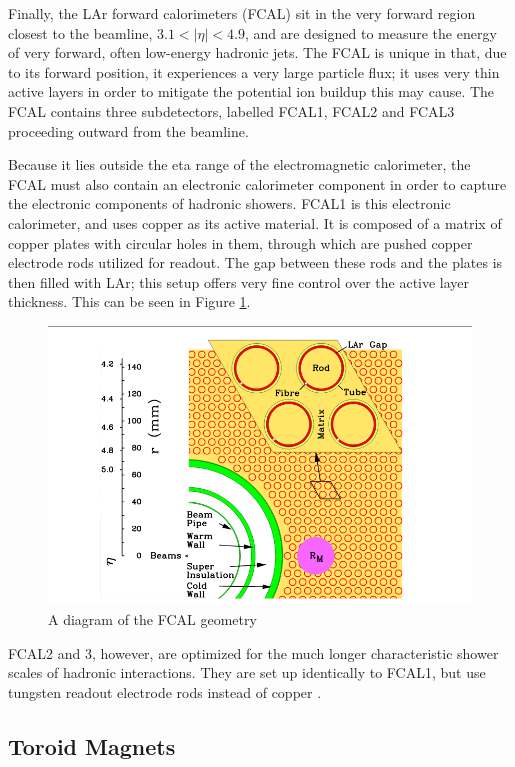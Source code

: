 Finally, the LAr forward calorimeters (FCAL) sit in the very forward region closest to the beamline, $3.1<|\eta |< 4.9$, and are designed to measure the energy of very forward, often low-energy hadronic jets.  The FCAL is unique in that, due to its forward position, it experiences a very large particle flux; it uses very thin active layers in order to mitigate the potential ion buildup this may cause.  The FCAL contains three subdetectors, labelled FCAL1, FCAL2 and FCAL3 proceeding outward from the beamline.

Because it lies outside the eta range of the electromagnetic calorimeter, the FCAL must also contain an electronic calorimeter component in order to capture the electronic components of hadronic showers. FCAL1 is this electronic calorimeter, and uses copper as its active material. It is composed of a matrix of copper plates with circular holes in them, through which are pushed copper electrode rods utilized for readout. The gap between these rods and the plates is then filled with LAr; this setup offers very fine control over the active layer thickness. This can be seen in Figure \ref{fig:FCAL}.

\begin{figure}
  \includegraphics[width=\linewidth]{figures/detector_chapter/FCAL.png}
  \caption{A diagram of the FCAL geometry \cite{ATLAS_Jinst}}
  \label{fig:FCAL}
\end{figure}


FCAL2 and 3, however, are optimized for the much longer characteristic shower scales of hadronic interactions. They are set up identically to FCAL1, but use tungsten readout electrode rods instead of copper \cite{ATLAS_Jinst}.

\subsection{Toroid Magnets} \label{sec:toroids}

